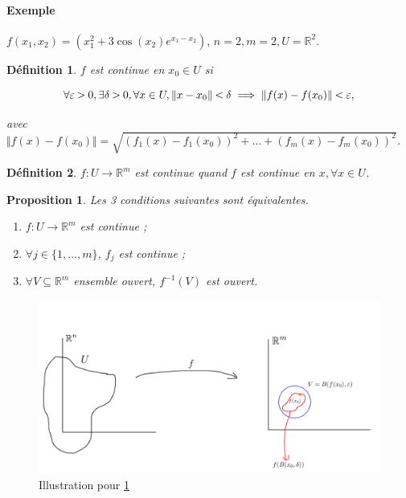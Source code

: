 \documentclass[french]{article}
\newtheorem{prop}{Proposition}[section]
\newtheorem{definition}{Définition}[section]
\newcommand{\lesss}{\rotatebox[origin=c]{90}{$\land$}}
\newcommand{\less}{\ \lesss\ }
\newcommand{\biggg}{\rotatebox[origin=c]{90}{$\lor$}}
\newcommand{\bg}{\ \biggg\ }
\begin{document}
\paragraph{Exemple}

$f(x_1, x_2) = (x_1 ^2+ 3 \cos(x_2) e^{x_1-x_2} )$, $n=2, m=2, U = \mathbb{R}^2$.

\begin{definition}
  $f$ est continue en $x_0 \in U$ si

  $$ \forall \varepsilon  \bg 0, \exists \delta  \bg 0, \forall x \in U, \Vert x-x_0 \Vert \less \delta \implies \Vert f(x)-f(x_0) \Vert \less \varepsilon, $$

  avec   $\Vert f(x)-f(x_0) \Vert = \sqrt{ (f_1(x)-f_1(x_0)) ^2 + \dots + (f_m(x)-f_m(x_0)) ^2 } $.
\end{definition}

\begin{definition}
  $f : U \to \mathbb{R}^m$ est continue quand $f$ est continue en $x, \forall x \in U$.
\end{definition}

\begin{prop} \label{continue}
  Les 3 conditions suivantes sont équivalentes.

  \begin{enumerate}
    \item $f : U \to \mathbb{R}^m$ est continue ;
    \item $\forall j \in \{ 1, \dots, m \} $, $f_j$ est continue ;
    \item $\forall V \subseteq \mathbb{R}^m$ ensemble ouvert, $f  ^{-1} (V)$ est ouvert.
  \end{enumerate}
\end{prop}

\begin{figure}[h!]
  \centering
  \includegraphics[scale=0.2]{figures/boule_continue.png}
  \caption{Illustration pour \ref{continue}}
  \label{}
\end{figure}
\end{document}
